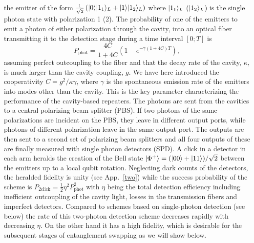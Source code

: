 the emitter of the form
$\frac{1}{\sqrt{2}}\left(| 0 \rangle| 1_{1} \rangle_{L}+| 1 \rangle| 1_{2} \rangle_{L}\right)$
where $| 1_{1} \rangle_{L}$ ($| 1_{2} \rangle_{L}$) is the single photon state with
polarization 1 (2). The probability of one of the emitters to emit a photon of
either polarization through the cavity, into an optical fiber transmitting it to
the detection stage during a time interval $[0;T]$ is
\begin{equation} \label{eq:phot1}
P_{\text{phot}}=\frac{4C}{1+4C}\left(1-e^{-\gamma(1+4C)T}\right), 
\end{equation} 
assuming perfect outcoupling to the fiber and that the decay rate of the cavity,
$\kappa$, is much larger than the cavity coupling, $g$. We have here introduced
the cooperativity $C=g^{2}/\kappa\gamma$, where $\gamma$ is the spontaneous
emission rate of the emitters into modes other than the cavity. This is the key
parameter characterizing the performance of the cavity-based repeaters. The
photons are sent from the cavities to a central polarizing beam splitter (PBS).
If two photons of the same polarizations are incident on the PBS, they leave in
different output ports, while photons of different polarization leave in the
same output port. The outputs are then sent to a second set of polarizing beam
splitters and all four outputs of these are finally measured with single photon
detectors (SPD). A click in a detector in each arm heralds the creation of the
Bell state $| \Phi^{+} \rangle=(| 00 \rangle+| 11 \rangle)/\sqrt{2}$ between the emitters up
to a local qubit rotation. Neglecting dark counts of the detectors, the heralded
fidelity is unity (see App.~\ref{two}) while the success probability of the
scheme is $P_{\text{2click}}=\frac{1}{2}\eta^{2}P_{\text{phot}}^{2}$ with $\eta$
being the total detection efficiency including inefficient outcoupling of the
cavity light, losses in the transmission fibers and imperfect detectors.
Compared to schemes based on single-photon detection (see below) the rate of
this two-photon detection scheme decreases rapidly with decreasing $\eta$. On
the other hand it has a high fidelity, which is desirable for the subsequent
stages of entanglement swapping as we will show below.

